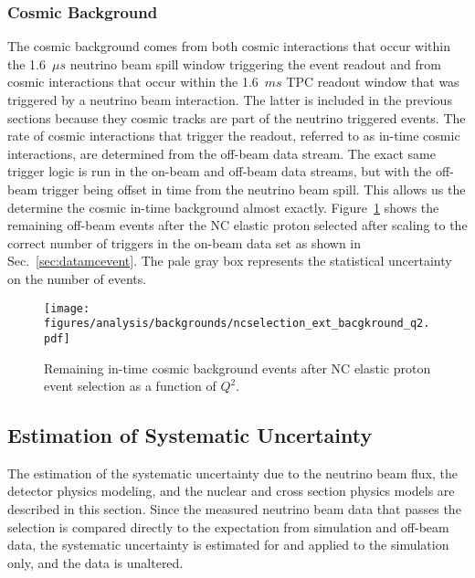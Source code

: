   \subsubsection{Cosmic Background}
    The cosmic background comes from both cosmic interactions that occur within
    the 1.6~$\mu s$ neutrino beam spill window triggering the event readout and
    from cosmic interactions that occur within the 1.6~$ms$ TPC readout window
    that was triggered by a neutrino beam interaction. The latter is included
    in the previous sections because they cosmic tracks are part of the
    neutrino triggered events. The rate of cosmic interactions that trigger the
    readout, referred to as in-time cosmic interactions, are determined from
    the off-beam data stream. The exact same trigger logic is run in the
    on-beam and off-beam data streams, but with the off-beam trigger being
    offset in time from the neutrino beam spill. This allows us the determine
    the cosmic in-time background almost exactly.  Figure~\ref{fig:selectedext}
    shows the remaining off-beam events after the NC elastic proton selected
    after scaling to the correct number of triggers in the on-beam data set as
    shown in Sec.~\ref{sec:datamcevent}. The pale gray box represents the
    statistical uncertainty on the number of events.
    \begin{figure}[ht]
      \centering
      \texttt{[image: figures/analysis/backgrounds/ncselection\_ext\_bacgkround\_q2.pdf]}
      \caption{Remaining in-time cosmic background events after NC elastic
      proton event selection as a function of $Q^2$.}
      \label{fig:selectedext}
    \end{figure}
  

\subsection{Estimation of Systematic Uncertainty}\label{sec:systematics}
  The estimation of the systematic uncertainty due to the neutrino beam flux,
  the detector physics modeling, and the nuclear and cross section physics
  models are described in this section. Since the measured neutrino beam data
  that passes the selection is compared directly to the expectation from
  simulation and off-beam data, the systematic uncertainty is estimated for and
  applied to the simulation only, and the data is unaltered.
